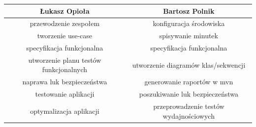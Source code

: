 \documentclass[a4paper,11pt]{article}
\begin{document}
\begin{tabular}{ c | c }
  Łukasz Opioła & Bartosz Polnik \\ \hline
  przewodzenie zespołem & konfiguracja środowiska \\
  tworzenie use-case & spisywanie minutek \\
  specyfikacja funkcjonalna & specyfikacja funkcjonalna \\
  utworzenie planu testów funkcjonalnych & utworzenie diagramów klas/sekwencji \\
  naprawa luk bezpieczeństwa & generowanie raportów w mvn \\
  testowanie aplikacji & poszukiwanie luk bezpieczeństwa \\
  optymalizacja aplikacji & przeprowadzenie testów wydajnościowych
\end{tabular}
\end{document}
